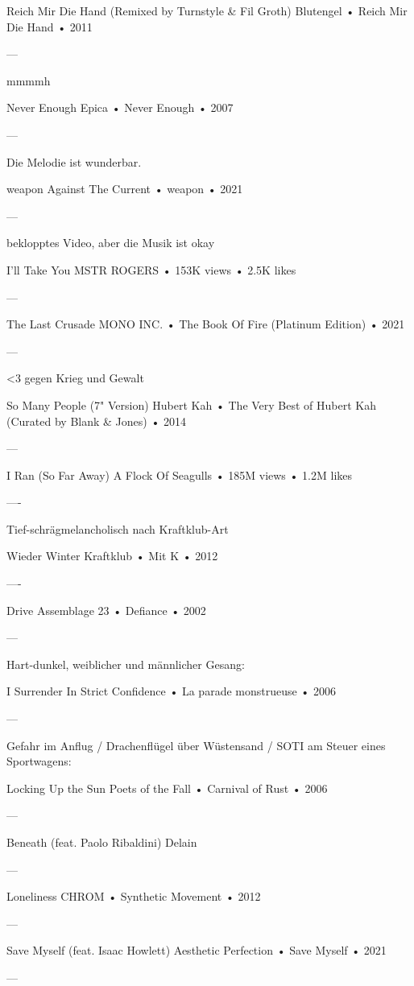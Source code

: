 Reich Mir Die Hand (Remixed by Turnstyle & Fil Groth)
Blutengel
 •
Reich Mir Die Hand
 •
2011


—

mmmmh

Never Enough
Epica
 •
Never Enough
 •
2007

—

Die Melodie ist wunderbar.

weapon
Against The Current
 •
weapon
 •
2021

—

beklopptes Video, aber die Musik ist okay

I'll Take You
MSTR ROGERS
 •
153K views
 •
2.5K likes

—

The Last Crusade
MONO INC.
 •
The Book Of Fire (Platinum Edition)
 •
2021

—

<3
gegen Krieg und Gewalt

So Many People (7" Version)
Hubert Kah
 •
The Very Best of Hubert Kah (Curated by Blank & Jones)
 •
2014

—

I Ran (So Far Away)
A Flock Of Seagulls
 •
185M views
 •
1.2M likes

—-

Tief-schrägmelancholisch nach Kraftklub-Art

Wieder Winter
Kraftklub
 •
Mit K
 • 2012

—-

Drive
Assemblage 23
 •
Defiance
 • 2002

—

Hart-dunkel, weiblicher und männlicher Gesang:

I Surrender
In Strict Confidence
 •
La parade monstrueuse
 •
2006

—

Gefahr im Anflug / Drachenflügel über Wüstensand / SOTI am Steuer eines Sportwagens:

Locking Up the Sun
Poets of the Fall
 •
Carnival of Rust
 •
2006

—

Beneath (feat. Paolo Ribaldini)
Delain

—

Loneliness
CHROM
 •
Synthetic Movement
 •
2012

—

Save Myself (feat. Isaac Howlett)
Aesthetic Perfection
 •
Save Myself
 •
2021

—

